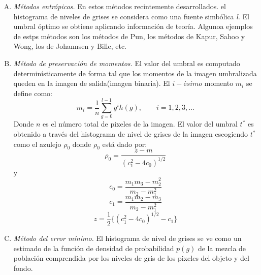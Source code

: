 \documentclass[12pt]{report}
\begin{document}
\begin{enumerate}[A.]
\item \textit{Métodos entrópicos.} En estos métodos recintemente desarrollados. el histograma de niveles de grises se considera como una fuente simbólica \textit{l}. El umbral óptimo se obtiene aplicando información de teoría. Algunoa ejemplos de estps métodos son los métodos de Pun, los métodos de Kapur, Sahoo y Wong, los de Johannsen y Bille, etc.

\item \textit{Método de preservación de momentos.} El valor del umbral es computado  determinísticamente de forma tal que los momentos de la imagen umbralizada queden en la imagen de salida(imagen binaria). El $i-ésimo$ momento $m_{i}$ se define como:
\begin{equation} m_{i} = \frac{1}{n} \sum_{g = 0}^{l - 1}g^{i}h(g), \qquad i = 1, 2, 3, ...\end{equation}
Donde $n$ es el número total de pixeles de la imagen. El valor del umbral $t^{*}$ es obtenido a través del histograma de nivel de grises de la imagen escogiendo $t^{*}$ como el azulejo $\rho_{0}$ donde $\rho_{0}$ está dado por:
\begin{equation} \rho_{0} = \frac{z - m}{(c_{1}^{2} - 4c_{0})^{1/2}}\end{equation}
y 
\begin{equation}c_{0} = \frac{m_{1}m_{3} - m_{2}^{2}}{m_{2} - m_{1}^{2}} \end{equation}
\begin{equation}c_{1} = \frac{m_{1}m_{2} - m_{3}}{m_{2} - m_{1}^{2}} \end{equation}
\begin{equation}z = \frac{1}{2}\{(c_{1}^{2} - 4c_{0})^{1/2} - c_{1}\} \end{equation}

\item \textit{Método del error mínimo.} El histograma de nivel de grises  se ve como un estimado de la función de densidad de probabilidad $p(g)$ de la mezcla de población comprendida por los niveles de gris de los pixeles del objeto y del fondo.
\end{enumerate}
\end{document}
